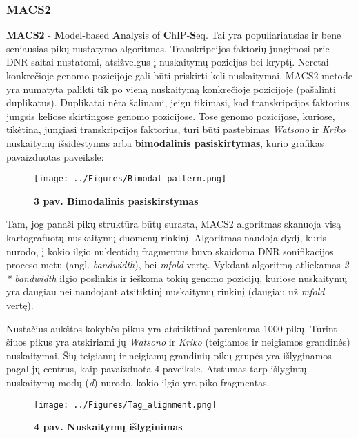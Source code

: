 \documentclass[12pt]{article}
\begin{document}
\subsubsection{MACS2}
\textbf{MACS2} - \textbf{M}odel-based \textbf{A}nalysis of
\textbf{C}hIP-\textbf{S}eq. Tai yra populiariausias ir bene seniausias
pikų nustatymo algoritmas.
Transkripcijos faktorių jungimosi prie DNR saitai nustatomi, atsižvelgus į
nuskaitymų pozicijas bei kryptį. Neretai konkrečioje genomo pozicijoje gali
būti priskirti keli nuskaitymai. MACS2 metode yra numatyta palikti tik po
vieną nuskaitymą konkrečioje pozicijoje (pašalinti duplikatus). Duplikatai
nėra šalinami, jeigu tikimasi, kad transkripcijos faktorius jungsis keliose
skirtingose genomo pozicijose. Tose genomo pozicijose, kuriose, tikėtina,
jungiasi transkripcijos faktorius, turi būti pastebimas \emph{Watsono} ir
\emph{Kriko} nuskaitymų išsidėstymas arba \textbf{bimodalinis pasiskirtymas},
kurio grafikas pavaizduotas paveiksle:

\begin{figure}[ht]
    \begin{center}
        \texttt{[image: ../Figures/Bimodal\_pattern.png]}
        \vspace{-1\baselineskip}
        \caption*{\small\textbf{3 pav. Bimodalinis pasiskirstymas}}
    \end{center}
\end{figure}

Tam, jog panaši pikų struktūra būtų surasta, MACS2 algoritmas skanuoja visą
kartografuotų nuskaitymų duomenų rinkinį. Algoritmas naudoja dydį, kuris nurodo,
į kokio ilgio nukleotidų fragmentus buvo skaidoma DNR sonifikacijos proceso
metu (angl. \emph{bandwidth}), bei \emph{mfold} vertę. Vykdant algoritmą
atliekamas \emph{2 * bandwidth} ilgio poslinkis ir ieškoma tokių genomo
pozicijų, kuriose nuskaitymų yra daugiau nei naudojant atsitiktinį nuskaitymų
rinkinį (daugiau už \emph{mfold} vertę).

Nustačius aukštos kokybės pikus yra atsitiktinai parenkama 1000 pikų. Turint
šiuos pikus yra atskiriami jų \emph{Watsono} ir \emph{Kriko} (teigiamos ir
neigiamos grandinės) nuskaitymai.
Šių teigiamų ir neigiamų grandinių pikų grupės yra išlyginamos pagal jų
centrus, kaip pavaizduota 4 paveiksle. Atstumas tarp išlygintų nuskaitymų
modų (\emph{d}) nurodo, kokio ilgio yra piko fragmentas.

\begin{figure}[H]
    \begin{center}
        \texttt{[image: ../Figures/Tag\_alignment.png]}
        \caption*{\small\textbf{4 pav. Nuskaitymų išlyginimas}}
        \label{fig:birds}
    \end{center}
\end{figure}
\end{document}
